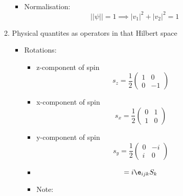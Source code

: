 \documentclass[cplx.tex]{subfiles}
\begin{document}
\begin{itemize}
\begin{enumerate}
\begin{itemize}
\begin{align}
                        \end{align}
                    \item Normalisation:
                        \begin{equation}
                            ||\psi|| = 1 \implies |v_1|^2 + |v_2|^2 = 1
                        \end{equation}
                \end{itemize}
            \item Physical quantites as operators in that Hilbert space
                \begin{itemize}
                    \item Rotations:
                        \begin{itemize}
                            \item z-component of spin
                                \begin{equation}
                                    s_z = \frac{1}{2} \begin{pmatrix} 1 & 0 \\ 0 & -1 \end{pmatrix}
                                \end{equation}
                            \item x-component of spin
                                \begin{equation}
                                    s_x = \frac{1}{2} \begin{pmatrix} 0 & 1 \\ 1 & 0 \end{pmatrix}
                                \end{equation}
                            \item y-component of spin
                                \begin{equation}
                                    s_y = \frac{1}{2} \begin{pmatrix} 0 & -i \\ i & 0 \end{pmatrix}
                                \end{equation}
                            \item 
                                \begin{equation}
                                    [S_i,S_j] = i\e_{ijk}S_k
                                \end{equation}
                            \item Note:

\end{itemize}
\end{itemize}
\end{enumerate}
\end{itemize}
\end{document}
